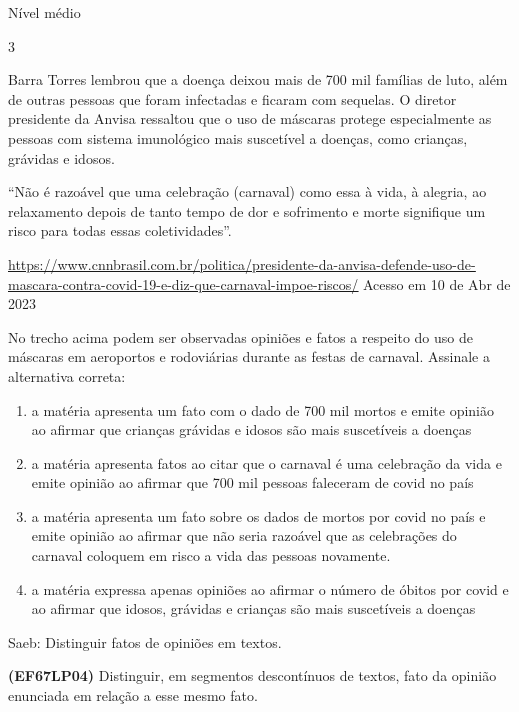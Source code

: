 {{\begin{escolha}
Nível médio

\num{3}

Barra Torres lembrou que a doença deixou mais de 700 mil famílias de
luto, além de outras pessoas que foram infectadas e ficaram com
sequelas. O diretor presidente da Anvisa ressaltou que o uso de máscaras
protege especialmente as pessoas com sistema imunológico mais suscetível
a doenças, como crianças, grávidas e idosos.

``Não é razoável que uma celebração (carnaval) como essa à vida, à
alegria, ao relaxamento depois de tanto tempo de dor e sofrimento e
morte signifique um risco para todas essas coletividades''.

\href{https://www.cnnbrasil.com.br/politica/presidente-da-anvisa-defende-uso-de-mascara-contra-covid-19-e-diz-que-carnaval-impoe-riscos/}{\uline{https://www.cnnbrasil.com.br/politica/presidente-da-anvisa-defende-uso-de-mascara-contra-covid-19-e-diz-que-carnaval-impoe-riscos/}}
Acesso em 10 de Abr de 2023

No trecho acima podem ser observadas opiniões e fatos a respeito do uso
de máscaras em aeroportos e rodoviárias durante as festas de carnaval.
Assinale a alternativa correta:

\begin{enumerate}
\def\labelenumi{\alph{enumi})}
\item
  a matéria apresenta um fato com o dado de 700 mil mortos e emite
  opinião ao afirmar que crianças grávidas e idosos são mais suscetíveis
  a doenças
\item
  a matéria apresenta fatos ao citar que o carnaval é uma celebração da
  vida e emite opinião ao afirmar que 700 mil pessoas faleceram de covid
  no país
\item
  a matéria apresenta um fato sobre os dados de mortos por covid no país
  e emite opinião ao afirmar que não seria razoável que as celebrações
  do carnaval coloquem em risco a vida das pessoas novamente.
\item
  a matéria expressa apenas opiniões ao afirmar o número de óbitos por
  covid e ao afirmar que idosos, grávidas e crianças são mais
  suscetíveis a doenças
\end{enumerate}

Saeb: Distinguir fatos de opiniões em textos.

\textbf{(EF67LP04)} Distinguir, em segmentos descontínuos de textos,
fato da opinião enunciada em relação a esse mesmo fato.


\end{escolha}}}
